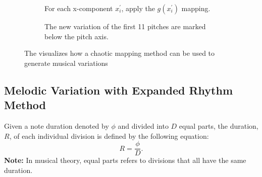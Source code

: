 \documentclass[11pt]{article}
\theoremstyle{definition}
\begin{document}
\begin{figure}
\begin{subfigure}{\textwidth}
  \caption{For each x-component $x^\prime_i$, apply the $g(x^\prime_{i})$ mapping.}
  \label{subfig:traj2nmp}

\end{subfigure}

\vspace{5pt}

\begin{subfigure}{\textwidth}
  \centering
  \caption{The new variation of the first 11 pitches  are marked below the pitch axis.}
  \label{subfig:nmp}

\end{subfigure}

\caption{The visualizes how a chaotic mapping method can be used to generate musical variations}
\label{fig:dabby method}
\end{figure}

\subsection{Melodic Variation with Expanded Rhythm Method} 
\label{subsec: melodicvariationwithexpandedrhythm}
Given a note duration denoted by $\phi$ and divided into $D$ equal parts, the duration, $R$, of each individual division is defined by the following equation:
$$ R = \frac{\phi}{D}.  $$
\textbf{Note:} In musical theory, equal parts refers to divisions that all have the same duration.
\end{document}
